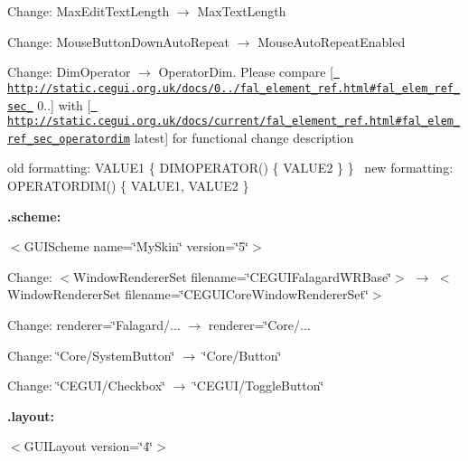 \begin{DoxyItemize}
\begin{DoxyItemize}
\item Change\+: Max\+Edit\+Text\+Length {$\rightarrow$} Max\+Text\+Length
\item Change\+: Mouse\+Button\+Down\+Auto\+Repeat {$\rightarrow$} Mouse\+Auto\+Repeat\+Enabled
\item Change\+: Dim\+Operator {$\rightarrow$} Operator\+Dim. Please compare \mbox{[}\href{http://static.cegui.org.uk/docs/0.7.9/fal_element_ref.html\#fal_elem_ref_sec_10}{\texttt{ http\+://static.\+cegui.\+org.\+uk/docs/0../fal\+\_\+element\+\_\+ref.\+html\#fal\+\_\+elem\+\_\+ref\+\_\+sec\+\_}} 0..\mbox{]} with \mbox{[}\href{http://static.cegui.org.uk/docs/current/fal_element_ref.html\#fal_elem_ref_sec_operatordim}{\texttt{ http\+://static.\+cegui.\+org.\+uk/docs/current/fal\+\_\+element\+\_\+ref.\+html\#fal\+\_\+elem\+\_\+ref\+\_\+sec\+\_\+operatordim}} latest\mbox{]} for functional change description
\begin{DoxyItemize}
\item old formatting\+: V\+A\+L\+U\+E1 \{ D\+I\+M\+O\+P\+E\+R\+A\+T\+O\+R() \{ V\+A\+L\+U\+E2 \} \}~\newline
 new formatting\+: O\+P\+E\+R\+A\+T\+O\+R\+D\+I\+M() \{ V\+A\+L\+U\+E1, V\+A\+L\+U\+E2 \}
\end{DoxyItemize}
\end{DoxyItemize}
\item {\bfseries{.scheme\+:}}
\begin{DoxyItemize}
\item $<$\+G\+U\+I\+Scheme name=\char`\"{}\+My\+Skin\char`\"{} version=\char`\"{}5\char`\"{}$>$
\item Change\+: $<$\+Window\+Renderer\+Set filename=\char`\"{}\+C\+E\+G\+U\+I\+Falagard\+W\+R\+Base\char`\"{}$>$ {$\rightarrow$} $<$\+Window\+Renderer\+Set filename=\char`\"{}\+C\+E\+G\+U\+I\+Core\+Window\+Renderer\+Set\char`\"{}$>$
\item Change\+: renderer=\char`\"{}\+Falagard/... {$\rightarrow$} renderer=\char`\"{}Core/...
\item Change\+: \char`\"{}\+Core/\+System\+Button\char`\"{} {$\rightarrow$} \char`\"{}\+Core/\+Button\char`\"{}
\item Change\+: \char`\"{}\+C\+E\+G\+U\+I/\+Checkbox\char`\"{} {$\rightarrow$} \char`\"{}\+C\+E\+G\+U\+I/\+Toggle\+Button\char`\"{}
\end{DoxyItemize}
\item {\bfseries{.layout\+:}}
\begin{DoxyItemize}
\item $<$\+G\+U\+I\+Layout version=\char`\"{}4\char`\"{}$>$

\end{DoxyItemize}
\end{DoxyItemize}
